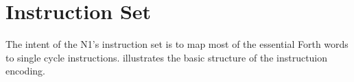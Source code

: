 

\section{Instruction Set}
\label{opcodes}

The intent of the N1's instruction set is to map most of the essential Forth words
to single cycle instructions.  illustrates the basic structure
of the instructuion encoding.

